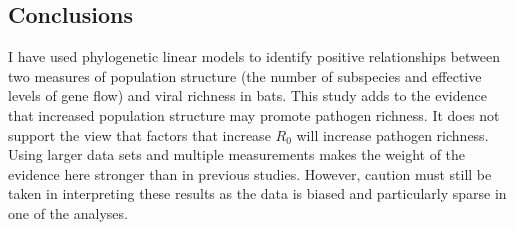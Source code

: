 \subsection{Conclusions}


I have used phylogenetic linear models to identify positive relationships between two measures of population structure (the number of subspecies and effective levels of gene flow) and viral richness in bats.
This study adds to the evidence that increased population structure may promote pathogen richness.
It does not support the view that factors that increase $R_0$ will increase pathogen richness.
Using larger data sets and multiple measurements makes the weight of the evidence here stronger than in previous studies.
However, caution must still be taken in interpreting these results as the data is biased and particularly sparse in one of the analyses.






























